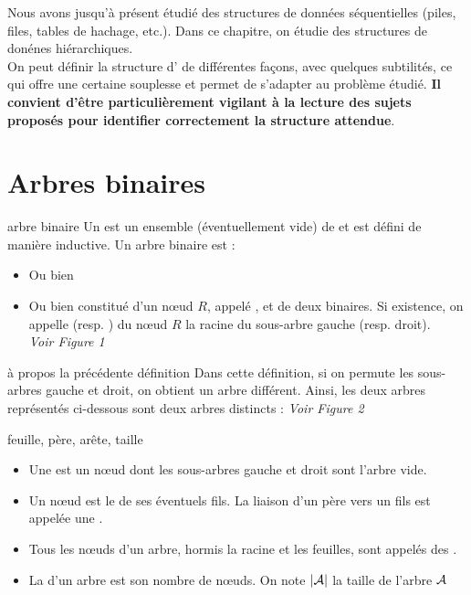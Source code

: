 

Nous avons jusqu'à présent étudié des structures de données séquentielles (piles, files, tables de hachage, etc.). Dans ce chapitre, on étudie des structures de donénes hiérarchiques. \\
On peut définir la structure d' de différentes façons, avec quelques subtilités, ce qui offre une certaine souplesse et permet de s'adapter au problème étudié. \textbf{Il convient d'être particulièrement vigilant à la lecture des sujets proposés pour identifier correctement la structure attendue}.
\section{Arbres binaires}

\begin{definition}{7.1}{arbre binaire}
    Un  est un ensemble (éventuellement vide) de  et est défini de manière inductive. Un arbre binaire est : \begin{itemize}
        \item Ou bien 
        \item Ou bien constitué d'un nœud $R$, appelé , et de deux  binaires. Si existence, on appelle  (resp. ) du nœud $R$ la racine du sous-arbre gauche (resp. droit). \\ \textit{Voir Figure 1}
    \end{itemize}
\end{definition}

\begin{remarque}{7.2}{à propos la précédente définition}
    Dans cette définition, si on permute les sous-arbres gauche et droit, on obtient un arbre différent. Ainsi, les deux arbres représentés ci-dessous sont deux arbres distincts : \textit{Voir Figure 2}
\end{remarque}

\begin{definition}{7.3}{feuille, père, arête, taille}
    \begin{itemize}
        \item Une  est un nœud dont les sous-arbres gauche et droit sont l'arbre vide.
        \item Un nœud est le  de ses éventuels fils. La liaison d'un père vers un fils est appelée une .
        \item Tous les nœuds d'un arbre, hormis la racine et les feuilles, sont appelés des .
        \item La  d'un arbre est son nombre de nœuds. On note $|\mathcal{A}|$ la taille de l'arbre $\mathcal{A}$
    \end{itemize}
\end{definition}

